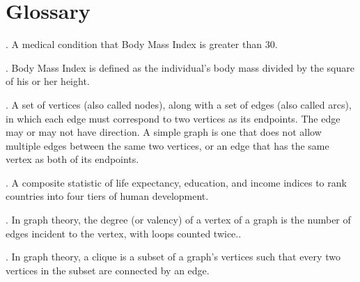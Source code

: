 \documentclass[oneside,12pt]{report}
\begin{document}


\appendix
{}


\chapter{Glossary}\label{Glossary}

\vspace{12pt}

\vspace{8pt}
. A medical condition that Body Mass Index is greater than 30.

\vspace{8pt}
. Body Mass Index is defined as the individual's body mass divided by the square of his or her height.

\vspace{8pt}
. A set of vertices (also called nodes), along with a set of edges (also called arcs), in which each edge must correspond to two vertices as its endpoints. The edge may or may not have direction. A simple graph is one that does not allow multiple edges between the same two vertices, or an edge that has the same vertex as both of its endpoints.

\vspace{8pt}
. A composite statistic of life expectancy, education, and income indices to rank countries into four tiers of human development.

\vspace{8pt} . In graph theory, the degree (or valency) of a vertex of a graph is the number of edges incident to the vertex, with loops counted twice..

\vspace{8pt} . In graph theory, a clique is a subset of a graph's vertices such that every two vertices in the subset are connected by an edge.
\end{document}

